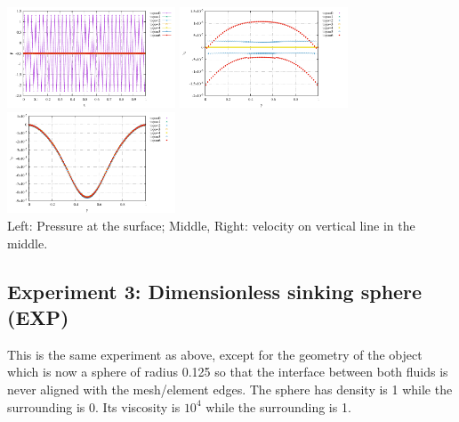 \begin{center}
\includegraphics[width=5cm]{python_codes/fieldstone_78/results/pressure_top_exp2.pdf}
\includegraphics[width=5cm]{python_codes/fieldstone_78/results/vx_profile_exp2.pdf}
\includegraphics[width=5cm]{python_codes/fieldstone_78/results/vy_profile_exp2.pdf}\\
{\captionfont Left: Pressure at the surface; Middle, Right: velocity on vertical line in the middle.}
\end{center}




\newpage
\subsection*{Experiment 3: Dimensionless sinking sphere (EXP)}

This is the same experiment as above, except for the geometry of the object 
which is now a sphere of radius 0.125 so that the interface between both fluids 
is never aligned with the mesh/element edges. The sphere has density is 1 while the surrounding is 0.
Its viscosity is $10^4$ while the surrounding is 1.

